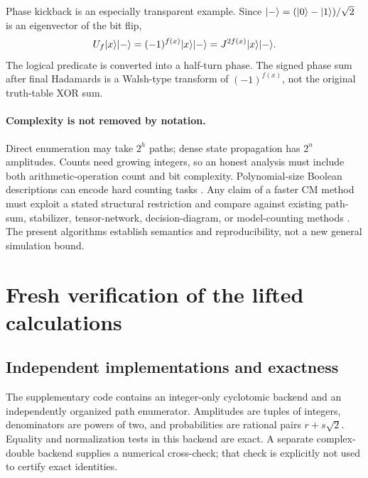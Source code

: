 Phase kickback is an especially transparent example. Since $\lvert -\rangle=(\lvert 0\rangle-\lvert 1\rangle)/\sqrt2$ is an eigenvector of the bit flip,
\begin{equation}
 U_f\lvert x\rangle\lvert -\rangle=(-1)^{f(x)}\lvert x\rangle\lvert -\rangle=J^{2f(x)}\lvert x\rangle\lvert -\rangle.
\end{equation}
The logical predicate is converted into a half-turn phase. The signed phase sum after final Hadamards is a Walsh-type transform of $(-1)^{f(x)}$, not the original truth-table XOR sum.

\paragraph{Complexity is not removed by notation.}
Direct enumeration may take $2^h$ paths; dense state propagation has $2^n$ amplitudes. Counts need growing integers, so an honest analysis must include both arithmetic-operation count and bit complexity. Polynomial-size Boolean descriptions can encode hard counting tasks \cite{dawson}. Any claim of a faster CM method must exploit a stated structural restriction and compare against existing path-sum, stabilizer, tensor-network, decision-diagram, or model-counting methods \cite{aaronson,markov,tdd,mei}. The present algorithms establish semantics and reproducibility, not a new general simulation bound.

\section{Fresh verification of the lifted calculations}\label{sec:verification}
\subsection{Independent implementations and exactness}
The supplementary code contains an integer-only cyclotomic backend and an independently organized path enumerator. Amplitudes are tuples of integers, denominators are powers of two, and probabilities are rational pairs $r+s\sqrt2$. Equality and normalization tests in this backend are exact. A separate complex-double backend supplies a numerical cross-check; that check is explicitly not used to certify exact identities.

